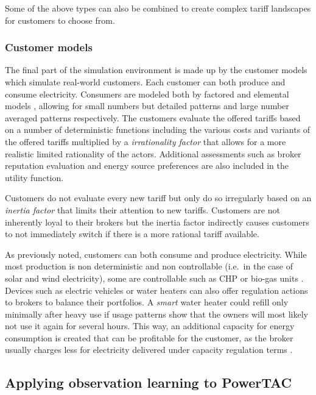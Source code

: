 Some of the above types can also be combined to create complex tariff landscapes for customers to choose from.

\subsubsection{Customer models}%

The final part of the simulation environment is made up by the customer models which simulate real-world customers.
Each customer can both produce and consume electricity. Consumers are modeled both by factored and elemental models
\citep[p.14]{ketter2018powertac}, allowing for small numbers but detailed patterns and large number averaged
patterns respectively. The customers evaluate the offered tariffs based on a number of deterministic functions
including the various costs and variants of the offered tariffs multiplied by a \emph{irrationality factor} that
allows for a more realistic limited rationality of the actors. Additional assessments such as broker reputation
evaluation and energy source preferences are also included in the utility function.

Customers do not evaluate every new tariff but only do so irregularly based on an \emph{inertia factor} that limits
their attention to new tariffs. Customers are not inherently loyal to their brokers but the inertia factor
indirectly causes customers to not immediately switch if there is a more rational tariff available.

As previously noted, customers can both consume and produce electricity. While most production is non deterministic
and non controllable (i.e.\ in the case of solar and wind electricity), some are controllable such as \ac{CHP} or
bio-gas units \citep[p.16]{ketter2018powertac}. Devices such as electric vehicles or water heaters can also offer
regulation actions to brokers to balance their portfolios. A \emph{smart} water heater could refill only minimally
after heavy use if usage patterns show that the owners will most likely not use it again for several hours. This
way, an additional capacity for energy consumption is created that can be profitable for the customer, as the broker
usually charges less for electricity delivered under capacity regulation terms \citep[p.14ff.]{ketter2018powertac}.

\subsection{Applying observation learning to PowerTAC}%
\label{sub:applying_observation_learning_to_powertac}

